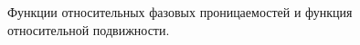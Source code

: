 \documentclass[a4paper,14pt,russian]{extreport}
\begin{document}
\begin{figure}

\caption{Функции относительных фазовых проницаемостей и функция относительной подвижности.}
\label{pic:example}
\end{figure}
\end{document}
